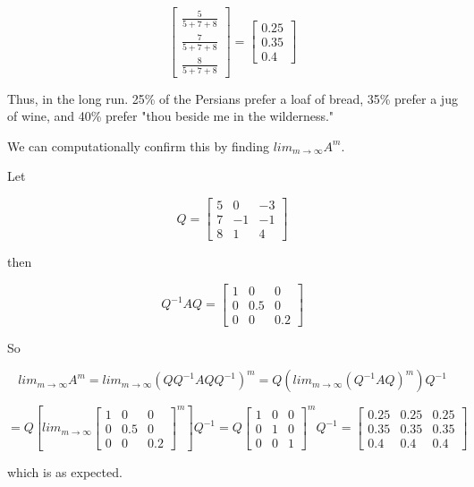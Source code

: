 \documentclass{amsart}
\theoremstyle{definition}
\theoremstyle{remark}
\numberwithin{equation}{section}
\begin{document}
\[  \begin{bmatrix}
\frac{5}{5 + 7 + 8} \\
\frac{7}{5 + 7 + 8}\\
\frac{8}{5 + 7 + 8}
\end{bmatrix} 
%
=
\begin{bmatrix}{}
0.25 \\
0.35 \\
0.4
\end{bmatrix} 
\]

Thus, in the long run. 25\% of the Persians prefer a loaf of bread, 35\% prefer a jug of wine, and 40\% prefer "thou beside me in the wilderness."

We can computationally confirm this by finding $lim_{m \to \infty}A^m$.

Let 

\begin{equation}
    Q = \begin{bmatrix}
           5 & 0 & -3  \\
           7 & -1 & -1 \\
           8 & 1 & 4
         \end{bmatrix}
\end{equation}


then

\begin{equation}
    Q^{-1}AQ = \begin{bmatrix}
           1 & 0 & 0  \\
           0 & 0.5 & 0 \\
           0 & 0 & 0.2
         \end{bmatrix}
\end{equation}

So 

\[  
lim_{m \to \infty}A^m =
lim_{m \to \infty}(QQ^{-1}AQQ^{-1})^m = 
Q(lim_{m \to \infty}(Q^{-1}AQ)^m)Q^{-1} \]

\[
= Q \left[ lim_{m \to \infty} 
\begin{bmatrix}
   1 & 0 & 0  \\
   0 & 0.5 & 0 \\
   0 & 0 & 0.2
 \end{bmatrix}^m \right] Q^{-1}
 =
Q 
\begin{bmatrix}
   1 & 0 & 0  \\
   0 & 1 & 0 \\
   0 & 0 & 1
 \end{bmatrix}^m Q^{-1}
 =
 \begin{bmatrix}{}
0.25 & 0.25 & 0.25 \\
0.35 & 0.35 & 0.35\\
0.4 & 0.4 & 0.4
\end{bmatrix}
\]

which is as expected.



 
\end{document}
